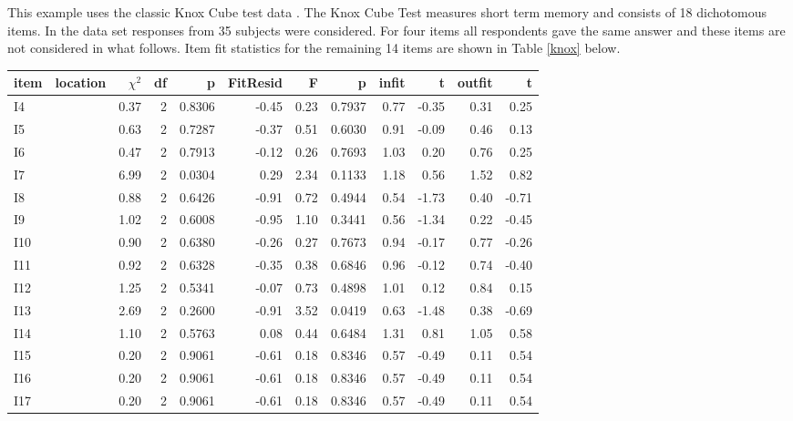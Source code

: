 \documentclass{article}
\begin{document}
This example uses the classic Knox Cube test data \cite{wright-stone}. The Knox Cube Test measures short term memory and consists of 18 dichotomous items. In the data set responses from 35 subjects were considered. For four items all respondents gave the same answer and these items are not considered in what follows. Item fit statistics for the remaining 14 items are shown in Table \ref{knox} below.

\begin{table}[b!]
  \centering
  \caption{The item locations and the values of seven item fit statistics for each of 14 Knox cube test items (sample size $N=35$)}\label{knox}
\begin{longtable}{|l|r|r|r|r|r|r|r|r|r|r|r|}\hline
item&location&$\chi^2$ &df &      p &FitResid &    F &      p & infit &     t & outfit&  t   \\\hline
 I4 &    &0.37 & 2 & 0.8306 &   -0.45 & 0.23 & 0.7937 &  0.77 & -0.35 & 0.31  &  0.25\\\hline
 I5 &    &0.63 & 2 & 0.7287 &   -0.37 & 0.51 & 0.6030 &  0.91 & -0.09 & 0.46  &  0.13\\\hline
 I6 &    &0.47 & 2 & 0.7913 &   -0.12 & 0.26 & 0.7693 &  1.03 &  0.20 & 0.76  &  0.25\\\hline
 I7 &    &6.99 & 2 & 0.0304 &    0.29 & 2.34 & 0.1133 &  1.18 &  0.56 & 1.52  &  0.82\\\hline
 I8 &    &0.88 & 2 & 0.6426 &   -0.91 & 0.72 & 0.4944 &  0.54 & -1.73 & 0.40  & -0.71\\\hline
 I9 &    &1.02 & 2 & 0.6008 &   -0.95 & 1.10 & 0.3441 &  0.56 & -1.34 & 0.22  & -0.45\\\hline
 I10&    &0.90 & 2 & 0.6380 &   -0.26 & 0.27 & 0.7673 &  0.94 & -0.17 & 0.77  & -0.26\\\hline
 I11&    &0.92 & 2 & 0.6328 &   -0.35 & 0.38 & 0.6846 &  0.96 & -0.12 & 0.74  & -0.40\\\hline
 I12&    &1.25 & 2 & 0.5341 &   -0.07 & 0.73 & 0.4898 &  1.01 &  0.12 & 0.84  &  0.15\\\hline
 I13&    &2.69 & 2 & 0.2600 &   -0.91 & 3.52 & 0.0419 &  0.63 & -1.48 & 0.38  & -0.69\\\hline
 I14&    &1.10 & 2 & 0.5763 &    0.08 & 0.44 & 0.6484 &  1.31 &  0.81 & 1.05  &  0.58\\\hline
 I15&    &0.20 & 2 & 0.9061 &   -0.61 & 0.18 & 0.8346 &  0.57 & -0.49 & 0.11  &  0.54\\\hline
 I16&    &0.20 & 2 & 0.9061 &   -0.61 & 0.18 & 0.8346 &  0.57 & -0.49 & 0.11  &  0.54\\\hline
 I17&    &0.20 & 2 & 0.9061 &   -0.61 & 0.18 & 0.8346 &  0.57 & -0.49 & 0.11  &  0.54\\\hline
\end{longtable}
\end{table}
\end{document}
